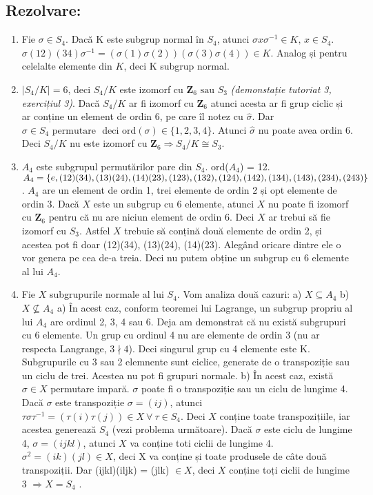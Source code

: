 \documentclass{article}
\begin{document}
\subsection{Rezolvare:}
\begin{enumerate}
    \item Fie $\sigma \in S_4$. Dacă K este subgrup normal în $S_4$, atunci $\sigma x \sigma^{-1} \in K, \, x \in S_4$.
    \newline
    $\sigma (12)(34) \sigma^{-1} = (\sigma(1)\sigma(2))(\sigma(3)\sigma(4)) \in K$. Analog și pentru celelalte elemente din $K$, deci K subgrup normal.
    \item $|S_4/K| = 6$, deci $S_4/K$ este izomorf cu $\mathbf{Z}_6 \text{ sau } S_3$ \emph{(demonstație tutoriat 3, exercițiul 3)}. Dacă $S_4/K$ ar fi izomorf cu $\mathbf{Z}_6$ atunci acesta ar fi grup ciclic și ar conține un element de ordin 6, pe care îl notez cu $\widehat{\sigma}$. Dar $\sigma \in S_4 \text{ permutare }$ deci ord$(\sigma) \in \{1, 2, 3, 4\}$. Atunci $\widehat{\sigma}$ nu poate avea ordin 6. Deci $S_4/K$ nu este izomorf cu $\mathbf{Z}_6 \Rightarrow S_4/K \cong S_3$.
    \item $A_4$ este subgrupul permutărilor pare din $S_4$. ord($A_4$) = 12. $A_4 = \{e, (12)(34), \newline (13)(24), (14)(23), (123), (132), (124), (142), (134), (143), (234), (243)\}$. $A_4$ are un element de ordin 1, trei elemente de ordin 2 și opt elemente de ordin 3. Dacă $X$ este un subgrup cu 6 elemente, atunci $X$ nu poate fi izomorf cu $\mathbf{Z}_6$ pentru că nu are niciun element de ordin 6. Deci $X$ ar trebui să fie izomorf cu $S_3$. Astfel $X$ trebuie să conțină două elemente de ordin 2, și acestea pot fi doar (12)(34), (13)(24), (14)(23). Alegând oricare dintre ele o vor genera pe cea de-a treia. Deci nu putem obține un subgrup cu 6 elemente al lui $A_4$.
    \item Fie $X$ subgrupurile normale al lui $S_4$. Vom analiza două cazuri: \newline
    a) $X \subseteq A_4$ \newline
    b) $X \nsubseteq A_4$ \newline
    a) În acest caz, conform teoremei lui Lagrange, un subgrup propriu al lui $A_4$ are ordinul 2, 3, 4 sau 6. Deja am demonstrat că nu există subgrupuri cu 6 elemente. Un grup cu ordinul 4 nu are elemente de ordin 3 (nu ar respecta Langrange, $3 \nmid 4$). Deci singurul grup cu 4 elemente este K. Subgrupurile cu 3 sau 2 elemnente sunt ciclice, generate de o transpoziție sau un ciclu de trei. Acestea nu pot fi grupuri normale. \newline
    b) În acest caz, există $\sigma \in X$ permutare impară. $\sigma$ poate fi o transpoziție sau un ciclu de lungime 4. Dacă $\sigma$ este transpoziție $\sigma = (ij)$, atunci $\tau \sigma \tau^{-1} = (\tau(i) \tau(j)) \in X \ \forall \ \tau \in S_4$. Deci $X$ conține toate transpozițiile, iar acestea generează $S_4$ (vezi problema următoare). Dacă $\sigma$ este ciclu de lungime 4, $\sigma = (ijkl)$, atunci $X$ va conține toti ciclii de lungime 4. $\sigma^2 = (ik)(jl) \in X$, deci X va conține și toate produsele de câte două transpoziții. Dar (ijkl)(iljk) = (jlk) $\in X$, deci $X$ conține toți ciclii de lungime 3 $\Rightarrow X = S_4$ .  
\end{enumerate}
\end{document}
